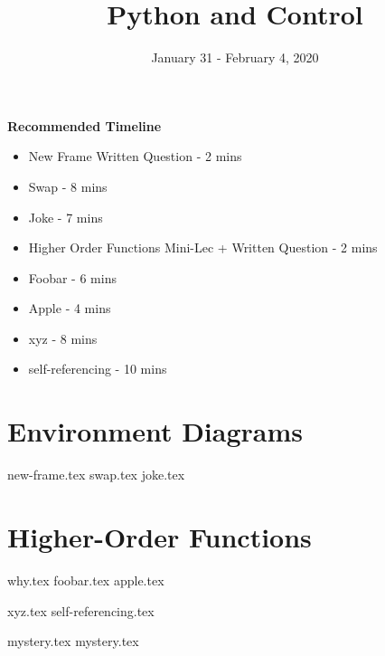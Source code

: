 \documentclass{exam}
\title{Python and Control}
\date{January 31 - February 4, 2020}
\begin{document}
\maketitle


\begin{blocksection}
\begin{guide}
\textbf{Recommended Timeline}
\begin{itemize}
    \item New Frame Written Question - 2 mins
    \item Swap - 8 mins
    \item Joke - 7 mins
    \item Higher Order Functions Mini-Lec + Written Question - 2 mins
    \item Foobar - 6 mins
    \item Apple - 4 mins
    \item xyz - 8 mins
    \item self-referencing - 10 mins
\end{itemize}
\end{guide}
\end{blocksection}


\section{Environment Diagrams}
\begin{questions}
{new-frame.tex}
{swap.tex}
\newpage
{joke.tex}
\end{questions}

\newpage
\section{Higher-Order Functions}
\begin{questions}
{why.tex}
{foobar.tex}
{apple.tex}

\newpage
{xyz.tex}
{self-referencing.tex}

\newpage
{mystery.tex}
{mystery.tex}
\clearpage

\end{questions}
\end{document}
